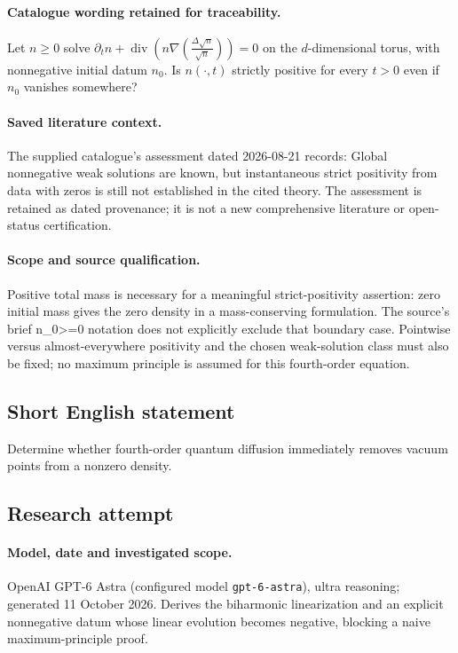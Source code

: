 \documentclass[11pt]{article}
\begin{document}
\paragraph{Catalogue wording retained for traceability.}
Let $n\geq0$ solve $\partial_t n+\operatorname{div}\!\left(n\nabla\left(\frac{\Delta\sqrt n}{\sqrt n}\right)\right)=0$ on the $d$-dimensional torus, with nonnegative initial datum $n_0$. Is $n(\cdot,t)$ strictly positive for every $t>0$ even if $n_0$ vanishes somewhere?

\paragraph{Saved literature context.} The supplied catalogue's assessment dated 2026-08-21 records: Global nonnegative weak solutions are known, but instantaneous strict positivity from data with zeros is still not established in the cited theory. The assessment is retained as dated provenance; it is not a new comprehensive literature or open-status certification.
\paragraph{Scope and source qualification.}Positive total mass is necessary for a meaningful strict-positivity assertion: zero initial mass gives the zero density in a mass-conserving formulation. The source's brief n_0>=0 notation does not explicitly exclude that boundary case. Pointwise versus almost-everywhere positivity and the chosen weak-solution class must also be fixed; no maximum principle is assumed for this fourth-order equation.
\subsection{Short English statement}
Determine whether fourth-order quantum diffusion immediately removes vacuum points from a nonzero density.
\subsection{Research attempt}
\paragraph{Model, date and investigated scope.}
OpenAI GPT-6 Astra (configured model \texttt{gpt-6-astra}), ultra reasoning; generated 11 October 2026. Derives the biharmonic linearization and an explicit nonnegative datum whose linear evolution becomes negative, blocking a naive maximum-principle proof.
\end{document}
